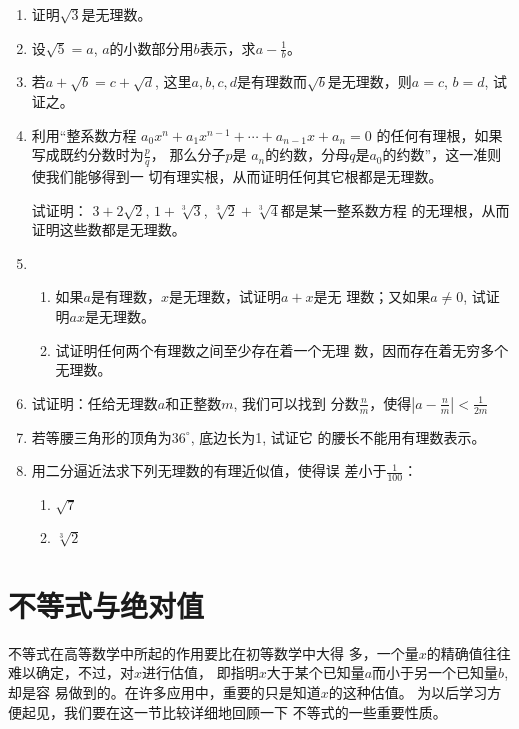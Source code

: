 \begin{enumerate}
    \item 证明$\sqrt{3}$是无理数。
    \item 设$\sqrt{5}=a$, $a$的小数部分用$b$表示，求$a-\frac{1}{b}$。
\item 若$a+\sqrt{b}=c+\sqrt{d}$, 这里$a,b,c,d$是有理数而$\sqrt{b}$是无理数，则$a=c$, $b=d$, 试证之。

\item 利用“整系数方程
$a_0x^n+a_1x^{n-1}+\cdots+a_{n-1}x+a_n=0$
的任何有理根，如果写成既约分数时为$\frac{p}{q}$，
那么分子$p$是
$a_n$的约数，分母$q$是$a_0$的约数”，这一准则使我们能够得到一
切有理实根，从而证明任何其它根都是无理数。

试证明：
$3+2\sqrt{2}$, $1+\sqrt[3]{3}$, $\sqrt[3]{2}+\sqrt[3]{4}$都是某一整系数方程
的无理根，从而证明这些数都是无理数。
\item \begin{enumerate}
    \item 如果$a$是有理数，$x$是无理数，试证明$a+x$是无
理数；又如果$a\ne 0$, 试证明$ax$是无理数。
\item 试证明任何两个有理数之间至少存在着一个无理
数，因而存在着无穷多个无理数。
\end{enumerate}

\item 试证明：任给无理数$a$和正整数$m$, 我们可以找到
分数$\frac{n}{m}$，使得$\left|a-\frac{n}{m}\right|<\frac{1}{2m}$
\item 若等腰三角形的顶角为$36^{\circ}$, 底边长为1, 试证它
的腰长不能用有理数表示。
\item 用二分逼近法求下列无理数的有理近似值，使得误
差小于$\frac{1}{100}$：
\begin{multicols}{2}
    \begin{enumerate}
        \item $\sqrt{7}$
        \item $\sqrt[3]{2}$
    \end{enumerate}
\end{multicols}
\end{enumerate}

\section{不等式与绝对值}
不等式在高等数学中所起的作用要比在初等数学中大得
多，一个量$x$的精确值往往难以确定，不过，对$x$进行估值，
即指明$x$大于某个已知量$a$而小于另一个已知量$b$, 却是容
易做到的。在许多应用中，重要的只是知道$x$的这种估值。
为以后学习方便起见，我们要在这一节比较详细地回顾一下
不等式的一些重要性质。

